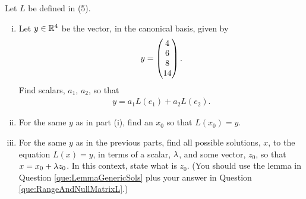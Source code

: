 \begin{question}
	\normalfont
	Let $L$ be defined in (5).
	
	\begin{enumerate}[(i)]
		
		
		\item Let $y\in{\mathbb R}^4$ be the vector, in the canonical basis, given by
		\begin{align*}
			y=\begin{pmatrix} 4\\ 6\\8 \\ 14\end{pmatrix}.
		\end{align*}
		Find scalars, $a_1$, $a_2$, so that
		\begin{align*}
			y= a_1L(e_1) + a_2 L(e_2).
		\end{align*}
		 
		\item For the same $y$ as in part (i), find an $x_0$ so that $L(x_0)=y$.
		\item For the same $y$ as in the previous parts, find all possible solutions, $x$, to the equation $L(x)=y$, in terms of a scalar, $\lambda$, and some vector, $z_0$, so that $x=x_0+\lambda z_0$.  In this context, state what is $z_0$.  (You should use the lemma in Question \ref{que:LemmaGenericSols} plus your answer in Question \ref{que:RangeAndNullMatrixL}.)  
	
	\end{enumerate}
\end{question}